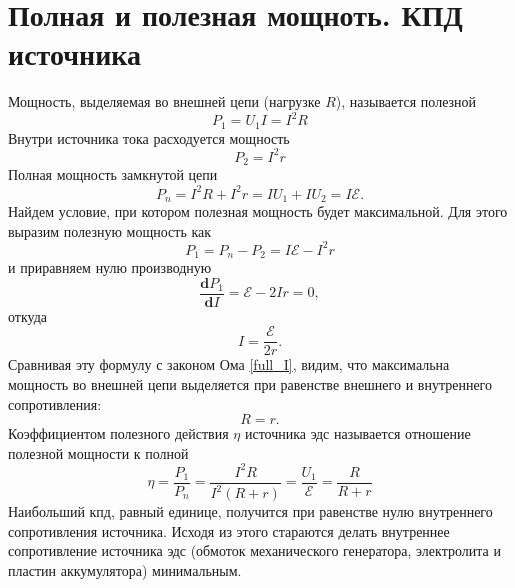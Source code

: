 \documentclass[a4paper,10pt]{book}
\begin{document}
\section{Полная и полезная мощноть. КПД источника}
Мощность, выделяемая во внешней цепи (нагрузке $R$), называется полезной
\begin{equation*}
 P_1 = U_1I = I^2R
\end{equation*}
Внутри источника тока расходуется мощность 
\begin{equation*}
 P_2 = I^2r
\end{equation*}
Полная мощность замкнутой цепи
\begin{equation}\label{full_P}
 P_n = I^2R + I^2r = IU_1 + IU_2 = I\mathcal{E}.
\end{equation}
Найдем условие, при котором полезная мощность будет максимальной. Для этого выразим полезную мощность как 
\begin{equation*}
 P_1 = P_n - P_2 = I\mathcal{E} - I^2r
\end{equation*}
и приравняем нулю производную
\begin{equation*}
 \frac{\mathbf{d}P_1}{\mathbf{d}I} = \mathcal{E} - 2Ir = 0,
\end{equation*}
откуда
\begin{equation}\label{profit_I}
 I = \frac{\mathcal{E}}{2r}.
\end{equation}
Сравнивая эту формулу с законом Ома \ref{full_I}, видим, что максимальна мощность во внешней цепи выделяется при равенстве внешнего и 
внутреннего сопротивления:
\begin{equation}\label{exeqin}
 R = r.
\end{equation}
Коэффициентом полезного действия $\eta$ источника эдс называется отношение полезной мощности к полной
\begin{equation}\label{nu}
 \eta = \frac{P_1}{P_n} = \frac{I^2R}{I^2(R + r)} = \frac{U_1}{\mathcal{E}} = \frac{R}{R + r}
\end{equation}
Наибольший кпд, равный единице, получится при равенстве нулю внутреннего сопротивления источника. Исходя из этого стараются делать внутреннее сопротивление источника эдс (обмоток механического генератора, электролита и пластин аккумулятора) минимальным.
\end{document}
